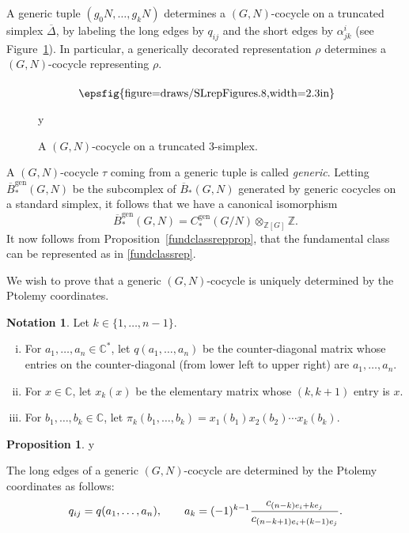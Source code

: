 \documentclass[11pt]{amsart}
\theoremstyle{definition}
\newtheorem{proposition}[theorem]{Proposition}
\newtheorem{notation}[theorem]{Notation}
\numberwithin{equation}{section}
\def\printname#1{
        \if\draft y
                \smash{\makebox[0pt]{\hspace{-0.5in}
                        \raisebox{8pt}{\tt\tiny #1}}}
        \fi
}
\newcommand{\psdraw}[2]
         {\begin{array}{c} \hspace{-1.3mm}
        \raisebox{-4pt}{\epsfig{figure=draws/#1,width=#2}}
        \hspace{-1.9mm}\end{array}}
\def\lbl#1{\label{#1}\printname{#1}}
\DeclareMathOperator{\gen}{gen}
\newcommand{\C}{\mathbb C}
\newcommand{\Z}{\mathbb Z}
\def\a{\alpha}
\begin{document}
A generic tuple $(g_0N,\dots,g_kN)$ determines a $(G,N)$-cocycle on a truncated simplex $\overline\Delta$, by labeling the long edges by $q_{ij}$ and the short edges by $\alpha^i_{jk}$ (see Figure~\ref{cocyclefigure}). In particular, a generically decorated representation $\rho$ determines a $(G,N)$-cocycle representing $\rho$. 

\begin{figure}[htpb]
$$
\psdraw{SLrepFigures.8}{2.3in}
$$
\caption{A $(G,N)$-cocycle on a truncated $3$-simplex.}\lbl{cocyclefigure}
\end{figure}

A $(G,N)$-cocycle $\tau$ coming from a generic tuple is called \emph{generic}. 
Letting $\overline B_*^{\gen}(G,N)$ be the subcomplex of $\overline B_*(G,N)$ generated by generic cocycles on a standard simplex, it follows that we have a canonical isomorphism
\begin{equation}
\overline B_*^{\gen}(G,N)=C_*^{\gen}(G/N)\otimes_{\Z[G]}\Z.
\end{equation} 
It now follows from Proposition~\ref{fundclassrepprop}, that the fundamental class can be represented as in \eqref{fundclassrep}. 

We wish to prove that a generic $(G,N)$-cocycle is uniquely determined by the Ptolemy coordinates.
\begin{notation}
Let $k\in\{1,\dots,n-1\}$.
\begin{enumerate}[(i)]
\item For $a_1,\dots,a_n\in\C^*$, let $q(a_1,\dots,a_n)$ be the counter-diagonal matrix whose entries on the counter-diagonal (from lower left to upper right) are $a_1,\dots ,a_n$.
\item For $x\in\C$, let $x_k(x)$ be the elementary matrix whose $(k,k+1)$ entry is $x$. 
\item For $b_1,\dots, b_k\in\C$, let $\pi_k(b_1,\dots,b_k)=x_1(b_1)x_2(b_2)\cdots x_k(b_k)$.
\end{enumerate}
\end{notation}




\begin{proposition}
\lbl{longedges} 
The long edges of a generic $(G,N)$-cocycle are determined by the Ptolemy coordinates as follows:
\begin{equation}
\lbl{qij}
q_{ij}=q(a_1,\dots,a_n),\qquad a_k=(-1)^{k-1}\frac{c_{(n-k)e_i+ke_j}}{c_{(n-k+1)e_i+(k-1)e_j}}.
\end{equation} 
\end{proposition}
\end{document}
